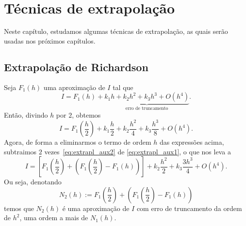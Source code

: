 
\chapter{Técnicas de extrapolação}\label{cap_extrapl}
\thispagestyle{fancy}

Neste capítulo, estudamos algumas técnicas de extrapolação, as quais serão usadas nos próximos capítulos.

\section{Extrapolação de Richardson}\label{cap_extrapl_sec_Richardson}

Seja $F_1(h)$ uma aproximação de $I$ tal que
\begin{equation}\label{eq:extrapl_aux1}
  I = F_1(h) + \underbrace{k_1h + k_2h^2 + k_3h^3 + O(h^4)}_{\text{erro de truncamento}}.
\end{equation}
Então, divindo $h$ por $2$, obtemos
\begin{equation}\label{eq:extrapl_aux2}
  I = F_1\left(\frac{h}{2}\right) + k_1\frac{h}{2} + k_2\frac{h^2}{4} + k_3\frac{h^3}{8} + O(h^4).
\end{equation}
Agora, de forma a eliminarmos o termo de ordem $h$ das expressões acima, subtraimos $2$ vezes~\eqref{eq:extrapl_aux2} de \eqref{eq:extrapl_aux1}, o que nos leva a
\begin{equation}
  I = \left[F_1\left(\frac{h}{2}\right) + \left(F_1\left(\frac{h}{2}\right) - F_1(h)\right)\right] + k_2\frac{h^2}{2} + k_3\frac{3h^3}{4} + O(h^4).
\end{equation}
Ou seja, denotando
\begin{equation}
  N_2(h) := F_1\left(\frac{h}{2}\right) + \left(F_1\left(\frac{h}{2}\right) - F_1(h)\right)
\end{equation}
temos que $N_2(h)$ é uma aproximação de $I$ com erro de truncamento da ordem de $h^2$, uma ordem a mais de $N_1(h)$.



\emconstrucao